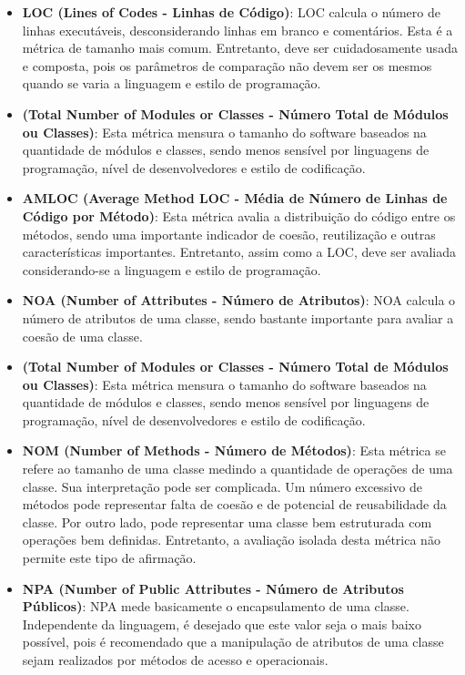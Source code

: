 \begin{itemize}
  \item \textbf{LOC (Lines of Codes - Linhas de Código)}: LOC calcula o número de linhas executáveis, desconsiderando linhas 
    em branco e comentários. Esta é a métrica de tamanho mais comum. Entretanto, deve ser cuidadosamente usada e composta, pois
    os parâmetros de comparação não devem ser os mesmos quando se varia a linguagem e estilo de programação.
  \item \textbf{(Total Number of Modules or Classes - Número Total de Módulos ou Classes)}: Esta métrica mensura o 
    tamanho do software baseados na quantidade de módulos e classes, sendo menos sensível por linguagens de programação, nível 
    de desenvolvedores e estilo de codificação.
  \item \textbf{AMLOC (Average Method LOC - Média de Número de Linhas de Código por Método)}: Esta métrica avalia a distribuição
    do código entre os métodos, sendo uma importante indicador de coesão, reutilização e outras características importantes. 
    Entretanto, assim como a LOC, deve ser avaliada considerando-se a linguagem e estilo de programação.
  \item \textbf{NOA (Number of Attributes - Número de Atributos)}: NOA calcula o número de atributos de uma classe, sendo 
    bastante importante para avaliar a coesão de uma classe.
  \item \textbf{(Total Number of Modules or Classes - Número Total de Módulos ou Classes)}: Esta métrica mensura o tamanho do 
    software baseados na quantidade de módulos e classes, sendo menos sensível por linguagens de programação, nível de
    desenvolvedores e estilo de codificação.
  \item \textbf{NOM (Number of Methods - Número de Métodos)}: Esta métrica se refere ao tamanho de uma classe medindo a 
    quantidade de operações de uma classe. Sua interpretação pode ser complicada. Um número excessivo de métodos pode 
    representar falta de coesão e de potencial de reusabilidade da classe. Por outro lado, pode representar uma classe bem 
    estruturada com operações bem definidas. Entretanto, a avaliação isolada desta métrica não permite este tipo de afirmação.
  \item \textbf{NPA (Number of Public Attributes - Número de Atributos Públicos)}: NPA mede basicamente o encapsulamento de 
    uma classe. Independente da linguagem, é desejado que este valor seja o mais baixo possível, pois é recomendado que a 
    manipulação de atributos de uma classe sejam realizados por métodos de acesso e operacionais.

\end{itemize}
